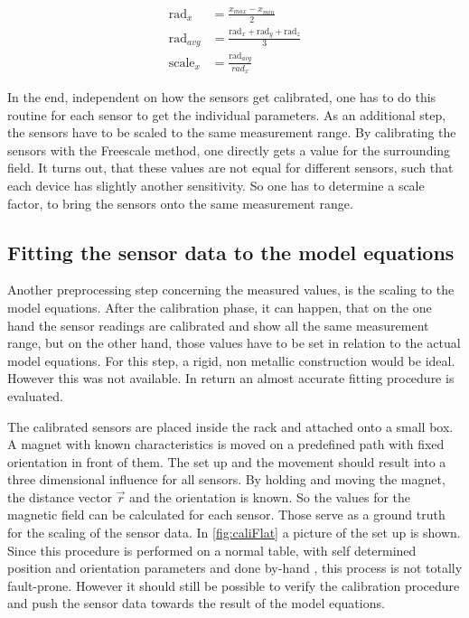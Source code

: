 \begin{equation} \label{eq:simpleScale}
\begin{aligned}
\mathrm{rad}_{x} &= \frac{x_{max} - x_{min}}{2}\\
\mathrm{rad}_{avg} &= \frac{\mathrm{rad}_{x} + \mathrm{rad}_{y} + \mathrm{rad}_{z}}{3}\\
\mathrm{scale}_{x} &= \frac{\mathrm{rad}_{avg}}{rad_{x}}
\end{aligned}
\end{equation}

In the end, independent on how the sensors get calibrated, one has to do this routine for each sensor to get the individual parameters. As an additional step, the sensors have to be scaled to the same measurement range. By calibrating the sensors with the Freescale method, one directly gets a value for the surrounding field. It turns out, that these values are not equal for different sensors, such that each device has slightly another sensitivity. So one has to determine a scale factor, to bring the sensors onto the same measurement range.


\subsection{Fitting the sensor data to the model equations} \label{subsec:modelFit}

Another preprocessing step concerning the measured values, is the scaling to the model equations. After the calibration phase, it can happen, that on the one hand the sensor readings are calibrated and show all the same measurement range, but on the other hand, those values have to be set in relation to the actual model equations. For this step, a rigid, non metallic construction would be ideal. However this was not available. In return an almost accurate fitting procedure is evaluated.

The calibrated sensors are placed inside the rack and attached onto a small box. A magnet with known characteristics is moved on a predefined path with fixed orientation in front of them. The set up and the movement should result into a three dimensional influence for all sensors. By holding and moving the magnet, the distance vector $ \vec{r} $ and the orientation is known. So the values for the magnetic field can be calculated for each sensor. Those serve as a ground truth for the scaling of the sensor data. In \ref{fig:caliFlat} a picture of the set up is shown. Since this procedure is performed on a normal table, with self determined position and orientation parameters and done \grqq by-hand \grqq, this process is not totally fault-prone. However it should still be possible to verify the calibration procedure and push the sensor data towards the result of the model equations.

